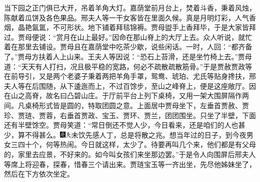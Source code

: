 当下园之正门俱已大开，吊着羊角大灯。嘉荫堂前月台上，焚着斗香，秉着风烛，陈献着瓜饼及各色果品。邢夫人等一干女客皆在里面久候。真是月明灯彩，人气香烟，晶艳氤氲，不可形状。地下铺着拜毯锦褥。贾母盥手上香拜毕，于是大家皆拜过。贾母便说：“赏月在山上最好。”因命在那山脊上的大厅上去。众人听说，就忙着在那里去铺设。贾母且在嘉荫堂中吃茶少歇，说些闲话。一时，人回：“都齐备了。”贾母方扶着人上山来。王夫人等因说：“恐石上苔滑，还是坐竹椅上去。”贾母道：“天天有人打扫，况且极平稳的宽路，何必不疏散疏散筋骨。”于是贾赦贾政等在前导引，又是两个老婆子秉着两把羊角手罩，鸳鸯、琥珀、尤氏等贴身搀扶，邢夫人等在后围随，从下逶迤而上，不过百馀步，至山之峰脊上，便是这座敞厅。因在山之高脊，故名曰凸碧山庄。于厅前平台上列下桌椅，又用一架大围屏隔作两间。凡桌椅形式皆是圆的，特取团圆之意。上面居中贾母坐下，左垂首贾赦、贾珍、贾琏、贾蓉，右垂首贾政、宝玉、贾环、贾兰，团团围坐。只坐了半壁，下面还有半壁馀空。贾母笑道：“常日倒还不觉人少，今日看来，还是咱们的人也甚少，算不得甚么。{\includegraphics[width=3mm]{../Images/00004}\includegraphics[width=3mm]{../Images/00012}\footnotesize \kaishu 未饮先感人丁，总是将散之兆。}想当年过的日子，到今夜男女三四十个，何等热闹。今日就这样，太少了。待要再叫几个来，他们都是有父母的，家里去应景，不好来的。如今叫女孩们来坐那边罢。”于是令人向围屏后邢夫人等席上将迎春，探春，惜春三个请出来。贾琏宝玉等一齐出坐，先尽他姊妹坐了，然后在下方依次坐定。

